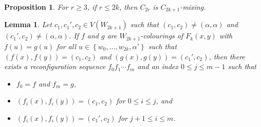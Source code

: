 \documentclass[11 pt]{amsart}
\newtheorem{lem}[equation]{Lemma}
\newtheorem{prop}[equation]{Proposition}
\theoremstyle{definition}
\theoremstyle{case}
\numberwithin{equation}{section}
\begin{document}
\begin{prop}
\label{cycleMix}
For $r\geq3$, if $r\leq 2k$, then $C_{2r}$ is $C_{2k+1}$-mixing. 
\end{prop}


\begin{lem}
\label{notAlphaAlpha}
Let $c_1,c_1',c_2\in V(W_{2k+1})$ such that $(c_1,c_2)\neq (\alpha,\alpha)$ and $(c_1',c_2)\neq (\alpha,\alpha)$. If $f$ and $g$ are $W_{2k+1}$-colourings of $F_k(x,y)$ with $f(u)=g(u)$ for all $u\in \left\{w_0,\dots,w_{2k},\alpha'\right\}$ such that $(f(x),f(y))= (c_1,c_2)$ and $(g(x),g(y))= (c_1',c_2)$, then there exists a reconfiguration sequence $f_0f_1\cdots f_m$  and an index $0\leq j\leq m-1$ such that 
\begin{itemize}
\item $f_0=f$ and $f_m=g$,
\item $(f_i(x),f_i(y))=(c_1,c_2)$ for $0\leq i\leq j$, and
\item $(f_i(x),f_i(y))=(c_1',c_2)$ for $j+1\leq i\leq m$. 
\end{itemize}
\end{lem}
\end{document}
